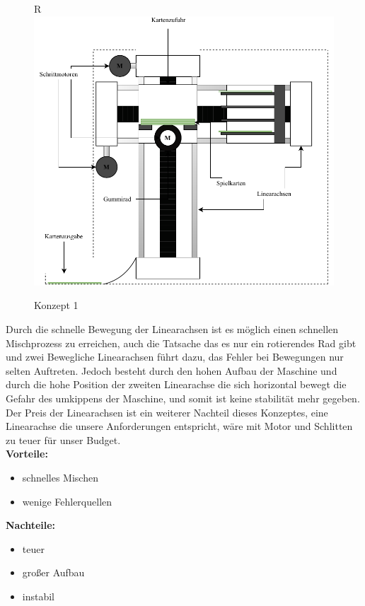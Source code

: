 \begin{figure}{R}
    \centering
    \includegraphics[scale=0.70,page=1]{fig/mech/Version_1_New}
    \caption{Konzept 1}
\end{figure}

Durch die schnelle Bewegung der Linearachsen ist es möglich einen schnellen Mischprozess zu erreichen,
auch die Tatsache das es nur ein rotierendes Rad gibt und zwei Bewegliche Linearachsen führt dazu, das
Fehler bei Bewegungen nur selten Auftreten. Jedoch besteht durch den hohen Aufbau der Maschine und durch die hohe
Position der zweiten Linearachse die sich horizontal bewegt die Gefahr des umkippens der Maschine, und somit ist
keine stabilität mehr gegeben. Der Preis der Linearachsen ist ein weiterer Nachteil dieses Konzeptes, eine Linearachse
die unsere Anforderungen entspricht, wäre mit Motor und Schlitten zu teuer für unser Budget. \\

\textbf{Vorteile:}
\begin{itemize}
    \item schnelles Mischen
    \item wenige Fehlerquellen
\end{itemize}
\textbf{Nachteile:}
\begin{itemize}
    \item teuer
    \item großer Aufbau %
    \item instabil
\end{itemize}

